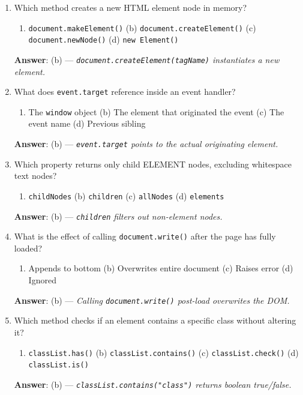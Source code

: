 \begin{enumerate}[leftmargin=1.5em]
    \item Which method creates a new HTML element node in memory?
    \begin{enumerate}[label=(\alph*)]
        \item \texttt{document.makeElement()} \quad (b) \texttt{document.createElement()} \quad (c) \texttt{document.newNode()} \quad (d) \texttt{new Element()}
    \end{enumerate}
    \textbf{Answer}: (b) --- \textit{\texttt{document.createElement(tagName)} instantiates a new element.}

    \item What does \texttt{event.target} reference inside an event handler?
    \begin{enumerate}[label=(\alph*)]
        \item The \texttt{window} object \quad (b) The element that originated the event \quad (c) The event name \quad (d) Previous sibling
    \end{enumerate}
    \textbf{Answer}: (b) --- \textit{\texttt{event.target} points to the actual originating element.}

    \item Which property returns only child ELEMENT nodes, excluding whitespace text nodes?
    \begin{enumerate}[label=(\alph*)]
        \item \texttt{childNodes} \quad (b) \texttt{children} \quad (c) \texttt{allNodes} \quad (d) \texttt{elements}
    \end{enumerate}
    \textbf{Answer}: (b) --- \textit{\texttt{children} filters out non-element nodes.}

    \item What is the effect of calling \texttt{document.write()} after the page has fully loaded?
    \begin{enumerate}[label=(\alph*)]
        \item Appends to bottom \quad (b) Overwrites entire document \quad (c) Raises error \quad (d) Ignored
    \end{enumerate}
    \textbf{Answer}: (b) --- \textit{Calling \texttt{document.write()} post-load overwrites the DOM.}

    \item Which method checks if an element contains a specific class without altering it?
    \begin{enumerate}[label=(\alph*)]
        \item \texttt{classList.has()} \quad (b) \texttt{classList.contains()} \quad (c) \texttt{classList.check()} \quad (d) \texttt{classList.is()}
    \end{enumerate}
    \textbf{Answer}: (b) --- \textit{\texttt{classList.contains("class")} returns boolean true/false.}
\end{enumerate}

